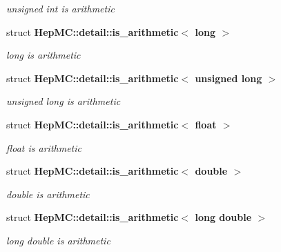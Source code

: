\begin{CompactItemize}
\begin{CompactList}\small\item\em unsigned int is arithmetic \item\end{CompactList}\item 
struct {\bf Hep\-MC::detail::is\_\-arithmetic$<$ long $>$}
\begin{CompactList}\small\item\em long is arithmetic \item\end{CompactList}\item 
struct {\bf Hep\-MC::detail::is\_\-arithmetic$<$ unsigned long $>$}
\begin{CompactList}\small\item\em unsigned long is arithmetic \item\end{CompactList}\item 
struct {\bf Hep\-MC::detail::is\_\-arithmetic$<$ float $>$}
\begin{CompactList}\small\item\em float is arithmetic \item\end{CompactList}\item 
struct {\bf Hep\-MC::detail::is\_\-arithmetic$<$ double $>$}
\begin{CompactList}\small\item\em double is arithmetic \item\end{CompactList}\item 
struct {\bf Hep\-MC::detail::is\_\-arithmetic$<$ long double $>$}
\begin{CompactList}\small\item\em long double is arithmetic \item\end{CompactList}\end{CompactItemize}

